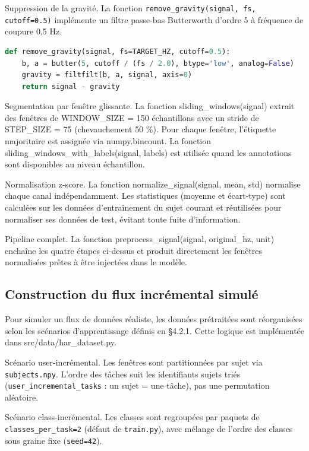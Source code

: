\documentclass[a4paper,12pt]{report}
\begin{document}
Suppression de la gravité. La fonction \texttt{remove\_gravity(signal, fs, cutoff=0.5)} implémente un filtre passe-bas Butterworth d'ordre 5 à fréquence de coupure 0,5 Hz.

\begin{lstlisting}[language=Python,caption={Suppression de la composante gravitationnelle},label=lst:gravity]
def remove_gravity(signal, fs=TARGET_HZ, cutoff=0.5):
    b, a = butter(5, cutoff / (fs / 2.0), btype='low', analog=False)
    gravity = filtfilt(b, a, signal, axis=0)
    return signal - gravity
\end{lstlisting}

Segmentation par fenêtre glissante. La fonction sliding\_windows(signal) extrait des fenêtres de WINDOW\_SIZE = 150 échantillons avec un stride de STEP\_SIZE = 75 (chevauchement 50 \%). Pour chaque fenêtre, l'étiquette majoritaire est assignée via numpy.bincount. La fonction sliding\_windows\_with\_labels(signal, labels) est utilisée quand les annotations sont disponibles au niveau échantillon.

Normalisation z-score. La fonction normalize\_signal(signal, mean, std) normalise chaque canal indépendamment. Les statistiques (moyenne et écart-type) sont calculées sur les données d'entraînement du sujet courant et réutilisées pour normaliser ses données de test, évitant toute fuite d'information.

Pipeline complet. La fonction preprocess\_signal(signal, original\_hz, unit) enchaîne les quatre étapes ci-dessus et produit directement les fenêtres normalisées prêtes à être injectées dans le modèle.

\subsection{Construction du flux incrémental simulé}

Pour simuler un flux de données réaliste, les données prétraitées sont réorganisées selon les scénarios d'apprentissage définis en §4.2.1. Cette logique est implémentée dans src/data/har\_dataset.py.

Scénario user-incrémental. Les fenêtres sont partitionnées par sujet via
\texttt{subjects.npy}. L'ordre des tâches suit les identifiants sujets
triés (\texttt{user\_incremental\_tasks} : un sujet = une tâche), pas une
permutation aléatoire.

Scénario class-incrémental. Les classes sont regroupées par paquets de
\texttt{classes\_per\_task=2} (défaut de \texttt{train.py}), avec mélange de
l'ordre des classes sous graine fixe (\texttt{seed=42}).
\end{document}
